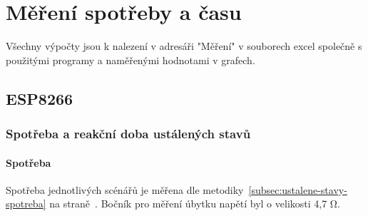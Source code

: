 \documentclass[a4paper, 12pt]{report}
\begin{document}


    \chapter{Měření spotřeby a času}
    Všechny výpočty jsou k nalezení v adresáři "Měření"  v souborech excel společně s použitými programy a naměřenými hodnotami v grafech.


    \section{ESP8266}

    \subsection{Spotřeba a reakční doba ustálených stavů}

    \subsubsection{Spotřeba}
    Spotřeba jednotlivých scénářů je měřena dle metodiky~\ref{subsec:ustalene-stavy-spotreba} na straně~\pageref{subsec:ustalene-stavy-spotreba}. Bočník pro měření úbytku napětí byl o velikosti 4,7 \si{\ohm}. \\
\end{document}
